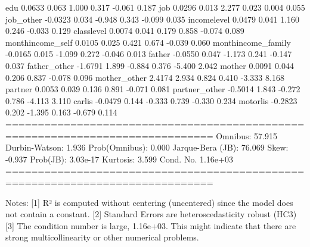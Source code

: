 edu                    0.0633      0.063      1.000      0.317      -0.061       0.187
job                    0.0296      0.013      2.277      0.023       0.004       0.055
job_other             -0.0323      0.034     -0.948      0.343      -0.099       0.035
incomelevel            0.0479      0.041      1.160      0.246      -0.033       0.129
classlevel             0.0074      0.041      0.179      0.858      -0.074       0.089
monthincome_self       0.0105      0.025      0.421      0.674      -0.039       0.060
monthincome_family    -0.0165      0.015     -1.099      0.272      -0.046       0.013
father                -0.0550      0.047     -1.173      0.241      -0.147       0.037
father_other          -1.6791      1.899     -0.884      0.376      -5.400       2.042
mother                 0.0091      0.044      0.206      0.837      -0.078       0.096
mother_other           2.4174      2.934      0.824      0.410      -3.333       8.168
partner                0.0053      0.039      0.136      0.891      -0.071       0.081
partner_other         -0.5014      1.843     -0.272      0.786      -4.113       3.110
carlis                -0.0479      0.144     -0.333      0.739      -0.330       0.234
motorlis              -0.2823      0.202     -1.395      0.163      -0.679       0.114
==============================================================================
Omnibus:                       57.915   Durbin-Watson:                   1.936
Prob(Omnibus):                  0.000   Jarque-Bera (JB):               76.069
Skew:                          -0.937   Prob(JB):                     3.03e-17
Kurtosis:                       3.599   Cond. No.                     1.16e+03
==============================================================================

Notes:
[1] R² is computed without centering (uncentered) since the model does not contain a constant.
[2] Standard Errors are heteroscedasticity robust (HC3)
[3] The condition number is large, 1.16e+03. This might indicate that there are
strong multicollinearity or other numerical problems.